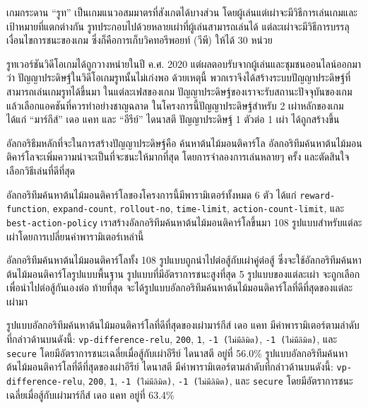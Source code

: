 \maketitle
\makesignature

\ifproject
\begin{abstractTH}
เกมกระดาน ``รูท'' เป็นเกมแนวอสมมาตรที่สังเกตได้บางส่วน โดยผู้เล่นแต่เผ่าจะมีวิธีการเล่นเกมและเป้าหมายที่แตกต่างกัน รูทประกอบไปด้วยหลายเผ่าที่ผู้เล่นสามารถเล่นได้ แต่ละเผ่าจะมีวิธีการบรรลุเงื่อนไขการชนะของเกม ซึ่งก็คือการเก็บวิคทอรีพอยท์ (วีพี) ให้ได้ 30 หน่วย

รูทเวอร์ชันวิดีโอเกมได้ถูกวางหน่ายในปี ค.ศ. 2020 แต่ผลตอบรับจากผู้เล่นและชุมชนออนไลน์ออกมาว่า ปัญญาประดิษฐ์ในวิดีโอเกมรูทนั้นไม่เก่งพอ ด้วยเหตุนี้ พวกเราจึงได้สร้างระบบปัญญาประดิษฐ์ที่สามารถเล่นเกมรูทได้ขึ้นมา ในแต่ละเฟสของเกม ปัญญาประดิษฐ์ของเราจะรับสถานะปัจจุบันของเกมแล้วเลือกแอคชันที่ควรทำอย่างชาญฉลาด ในโครงการนี้ปัญญาประดิษฐ์สำหรับ 2 เผ่าหลักของเกม ได้แก่ ``มาร์กีส์'' เดอ แคท และ ``อีรีย์'' ไดนาสตี ปัญญาประดิษฐ์ 1 ตัวต่อ 1 เผ่า ได้ถูกสร้างขึ้น 

อัลกอริธึมหลักที่จะในการสร้างปัญญาประดิษฐ์คือ ค้นหาต้นไม้มอนติคาร์โล อัลกอริทึมค้นหาต้นไม้มอนติคาร์โลจะเพิ่มความน่าจะเป็นที่จะชนะให้มากที่สุด โดยการจำลองการเล่นหลายๆ ครั้ง และตัดสินใจเลือกวิธีเล่นที่ดีที่สุด

อัลกอริทึมค้นหาต้นไม้มอนติคาร์โลของโครงการนี้มีพารามิเตอร์ทั้งหมด 6 ตัว ได้แก่ \texttt{reward-function}, \texttt{expand-count}, \texttt{rollout-no}, \texttt{time-limit}, \texttt{action-count-limit}, และ \texttt{best-action-policy} เราสร้างอัลกอริทึมค้นหาต้นไม้มอนติคาร์โลขึ้นมา 108 รูปแบบสำหรับแต่ละเผ่าโดยการเปลี่ยนค่าพารามิเตอร์เหล่านี้

อัลกอริทึมค้นหาต้นไม้มอนติคาร์โลทั้ง 108 รูปแบบถูกนำไปต่อสู้กับเผ่าคู่ต่อสู้ ซึ่งจะใช้อัลกอริทึมค้นหาต้นไม้มอนติคาร์โลรูปแบบพื้นฐาน รูปแบบที่มีอัตราการชนะสูงที่สุด 5 รูปแบบของแต่ละเผ่า จะถูกเลือกเพื่อนำไปต่อสู้กันเองต่อ ท้ายที่สุด จะได้รูปแบบอัลกอริทึมค้นหาต้นไม้มอนติคาร์โลที่ดีที่สุดของแต่ละเผ่ามา

รูปแบบอัลกอริทึมค้นหาต้นไม้มอนติคาร์โลที่ดีที่สุดของเผ่ามาร์กีส์ เดอ แคท มีค่าพารามิเตอร์ตามลำดับที่กล่าวด้านบนดังนี้: \texttt{vp-difference-relu}, \texttt{200}, \texttt{1}, \texttt{-1 (ไม่มีลิมิต)}, \texttt{-1 (ไม่มีลิมิต)}, และ \texttt{secure} โดยมีอัตราการชนะเฉลี่ยเมื่อสู้กับเผ่าอีรีย์ ไดนาสตี อยู่ที่ 56.0\% รูปแบบอัลกอริทึมค้นหาต้นไม้มอนติคาร์โลที่ดีที่สุดของเผ่าอีรีย์ ไดนาสตี มีค่าพารามิเตอร์ตามลำดับที่กล่าวด้านบนดังนี้: \texttt{vp-difference-relu}, \texttt{200}, \texttt{1}, \texttt{-1 (ไม่มีลิมิต)}, \texttt{-1 (ไม่มีลิมิต)}, และ \texttt{secure} โดยมีอัตราการชนะเฉลี่ยเมื่อสู้กับเผ่ามาร์กีส์ เดอ แคท อยู่ที่ 63.4\%


\end{abstractTH}

